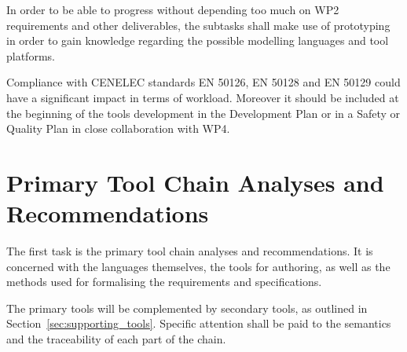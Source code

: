 \documentclass{template/openetcs_article}
\begin{document}
In order to be able to progress without depending too much on WP2 requirements and other deliverables, the subtasks shall make use of prototyping in order to gain knowledge regarding the possible modelling languages and tool platforms.  

Compliance with CENELEC standards EN 50126, EN 50128 and EN 50129 could have a
significant impact in terms of workload. Moreover it should be included at the
beginning of the tools development in the Development Plan or in a Safety or
Quality Plan in close collaboration with WP4.

\section{Primary Tool Chain Analyses and
           Recommendations}
\label{sec:core_tool}

The first task is the primary tool chain analyses and recommendations. It
is concerned with the languages themselves, the tools for authoring, as well as the methods used for formalising the requirements and specifications.

The primary tools will be complemented by secondary tools, as outlined in Section~\ref{sec:supporting_tools}.
Specific attention shall be paid to the semantics and the traceability of each part of the chain.



\end{document}
